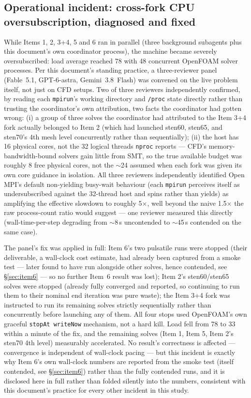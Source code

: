 \documentclass[11pt]{article}
\begin{document}
\subsection{Operational incident: cross-fork CPU oversubscription, diagnosed and fixed}
\label{sec:contention}
While Items 1, 2, 3+4, 5 and 6 ran in parallel (three background subagents plus this document's own
coordinator process), the machine became severely oversubscribed: load average reached 78 with 48
concurrent OpenFOAM solver processes. Per this document's standing practice, a three-reviewer panel
(Fable~5.1, GPT-6-astra, Gemini~3.8~Flash) was convened on the live problem itself, not just on CFD
setups. Two of three reviewers independently confirmed, by reading each \texttt{mpirun}'s working
directory and \texttt{/\allowbreak{}proc} state directly rather than trusting the coordinator's own attribution, two
facts the coordinator had gotten wrong: (i) a group of three solves the coordinator had attributed to
the Item 3+4 fork actually belonged to Item 2 (which had launched sten60, sten65, and sten70's 4th mesh
level concurrently rather than sequentially); (ii) the host has 16 physical cores, not the 32 logical
threads \texttt{nproc} reports --- CFD's memory-bandwidth-bound solvers gain little from SMT, so the
true available budget was roughly 8 free physical cores, not the $\sim$24 assumed when each fork was
given its own core guidance in isolation. All three reviewers independently identified Open MPI's
default non-yielding busy-wait behaviour (each \texttt{mpirun} perceives itself as undersubscribed
against the 32-thread host and spins rather than yields) as amplifying the effective slowdown to
roughly 5$\times$, well beyond the naive 1.5$\times$ the raw process-count ratio would suggest --- one
reviewer measured this directly (wall-time-per-step degrading from $\sim$8\,s uncontended to
$\sim$45\,s contended on the same case).

The panel's fix was applied in full: Item 6's two pulsatile runs were stopped (their deliverable, a
wall-clock cost estimate, had already been captured from a smoke test --- later found to have run alongside other solves, hence contended, see \S\ref{sec:item6} --- so no further Item~6 result was lost); Item 2's sten60/sten65 solves were stopped (already fully
converged and reported, so continuing to run them to their nominal end iteration was pure waste); the
Item 3+4 fork was instructed to run its remaining solves strictly sequentially rather than concurrently
before launching any of them. All four stops used OpenFOAM's own graceful \texttt{stopAt writeNow}
mechanism, not a hard kill. Load fell from 78 to 33 within a minute of the fix, and the remaining
solves (Item 1, Item 5, Item 2's sten70 4th level) measurably accelerated. No result's correctness is
affected --- convergence is independent of wall-clock pacing --- but this incident is exactly why Item
6's own wall-clock numbers are reported from the smoke test (itself contended, see \S\ref{sec:item6}) rather than the fully contended
runs, and it is disclosed here in full rather than folded silently into the numbers, consistent with
this document's practice for every other incident in this study.
\end{document}
